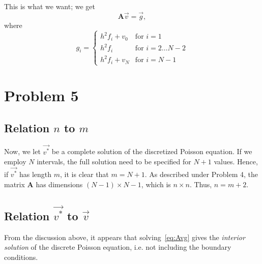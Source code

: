 \documentclass[english,notitlepage]{revtex4}  %
\begin{document}
This is what we want; we get 
\begin{equation}
    \mathbf A \vec v = \vec g, \label{eq:Avg}
\end{equation}
where 
\begin{equation}
    g_i = 
    \begin{cases}
        h^2 f_i + v_0 & \text{for $i = 1$}\\
        h^2 f_i       & \text{for $i = 2\ldots N-2$}\\
        h^2 f_i + v_N & \text{for $i = N-1$}
    \end{cases}
\end{equation}
%
%
\section*{Problem 5}
\subsection{Relation $n$ to $m$}
Now, we let $\vec{v^*}$ be a complete solution of the discretized Poisson equation. If we employ $N$ intervals, the full solution need to be specified for $N+1$ values. Hence, if 
$\vec{v^*}$ has length $m$, it is clear that $m=N+1$. As described under Problem 4, the matrix $\mathbf A$ has dimensions $(N-1)\times{N-1}$, which is $n\times n$. Thus, $n = m+2$.
\subsection{Relation $\vec{v^*}$  to $\vec{v}$}
From the discussion  above, it appears that solving~\ref{eq:Avg} gives the \emph{interior solution} of the discrete Poisson equation, i.e. not including the boundary conditions.  
\end{document}
